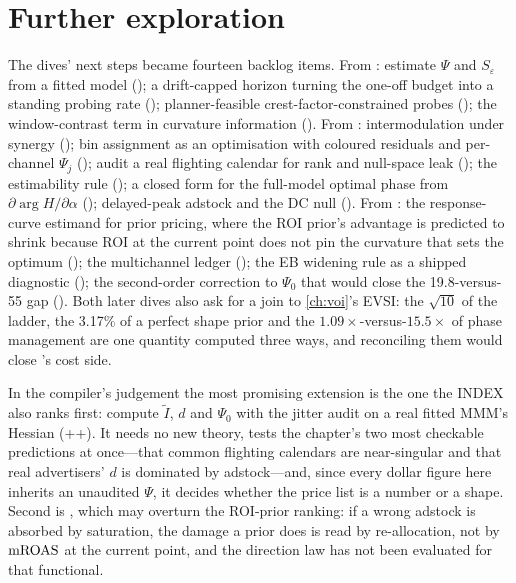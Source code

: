 \section{Further exploration}

The dives' next steps became fourteen backlog items. From : estimate $\Psi$ and $S_\varepsilon$ from a fitted model (); a drift-capped horizon turning the one-off budget into a standing probing rate (); planner-feasible crest-factor-constrained probes (); the window-contrast term in curvature information (). From : intermodulation under synergy (); bin assignment as an optimisation with coloured residuals and per-channel $\Psi_j$ (); audit a real flighting calendar for rank and null-space leak (); the estimability rule (); a closed form for the full-model optimal phase from $\partial\arg H/\partial\alpha$ (); delayed-peak adstock and the DC null (). From : the response-curve estimand for prior pricing, where the ROI prior's advantage is predicted to shrink because ROI at the current point does not pin the curvature that sets the optimum (); the multichannel ledger (); the EB widening rule as a shipped diagnostic (); the second-order correction to $\Psi_0$ that would close the 19.8-versus-55 gap (). Both later dives also ask for a join to \cref{ch:voi}'s EVSI: the $\sqrt{10}$ of the ladder, the 3.17\% of a perfect shape prior and the $1.09\times$-versus-$15.5\times$ of phase management are one quantity computed three ways, and reconciling them would close 's cost side.

In the compiler's judgement the most promising extension is the one the INDEX also ranks first: compute $\tilde I$, $d$ and $\Psi_0$ with the jitter audit on a real fitted MMM's Hessian (++). It needs no new theory, tests the chapter's two most checkable predictions at once---that common flighting calendars are near-singular and that real advertisers' $d$ is dominated by adstock---and, since every dollar figure here inherits an unaudited $\Psi$, it decides whether the price list is a number or a shape. Second is , which may overturn the ROI-prior ranking: if a wrong adstock is absorbed by saturation, the damage a prior does is read by re-allocation, not by $\mathrm{mROAS}$ at the current point, and the direction law has not been evaluated for that functional.

